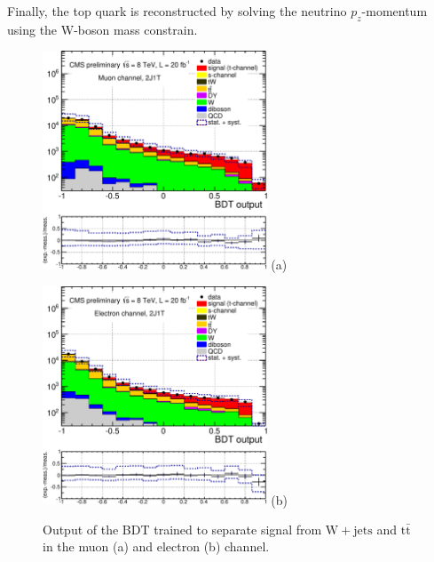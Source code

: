 \documentclass[a4paper]{jpconf}
\newcommand{\wjets}[0]{\mathrm{W+jets}}
\newcommand{\ttbar}[0]{\ensuremath{\mathrm{t\bar{t}}}}
\begin{document}
Finally, the top quark is reconstructed by solving the neutrino $p_{z}$-momentum using the W-boson mass constrain.



\begin{figure}[h]
\begin{center}
\begin{minipage}{7cm}
\includegraphics[height=6.5cm]{mva_bdt_mu-crop}
\center (a)
\end{minipage}\hspace{1cm}%
\begin{minipage}{7cm}
\includegraphics[height=6.5cm]{mva_bdt_el-crop}
\center (b)
\end{minipage} 
\caption{Output of the BDT trained to separate signal from $\wjets$ and $\ttbar$ in the muon (a) and electron (b) channel.}
\end{center}
\end{figure}
\end{document}
